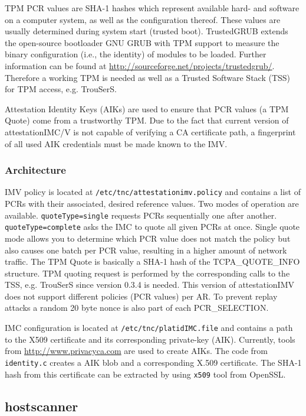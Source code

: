 \documentclass[a4paper,10pt]{scrartcl}
\newcommand{\code}[1]{{\tt{#1}}}
\begin{document}
TPM PCR values are SHA-1 hashes which represent available hard- and software on a computer system, as well as the configuration thereof. These values are usually determined during system start (trusted boot).
TrustedGRUB extends the open-source bootloader GNU GRUB with TPM support
to measure the binary configuration (i.e., the identity) of modules to be loaded.
Further information can be found at \url{http://sourceforge.net/projects/trustedgrub/}.
Therefore a working TPM is needed as well as a Trusted Software Stack (TSS) for TPM access, e.g. TrouSerS.

Attestation Identity Keys (AIKs) are used to ensure that PCR values (a TPM Quote) come from a trustworthy TPM.
Due to the fact that current version of attestationIMC/V is not capable of verifying a CA certificate path, a fingerprint of all used AIK credentials must be made known to the IMV.

\subsubsection{Architecture}

IMV policy is located at \code{/etc/tnc/attestationimv.policy} and contains
a list of PCRs with their associated, desired reference values.
Two modes of operation are available. \code{quoteType=single} requests PCRs sequentially one after another.
\code{quoteType=complete} asks the IMC to quote all given PCRs at once.
Single quote mode allows you to determine which PCR value does not match the policy but also causes 
one batch per PCR value, resulting in a higher amount of network traffic.
The TPM Quote is basically a SHA-1 hash of the TCPA\_QUOTE\_INFO structure.
TPM quoting request is performed by the corresponding calls to the TSS,
e.g. TrouSerS since version 0.3.4 is needed.
This version of attestationIMV does not support different policies (PCR values) per AR.
To prevent replay attacks a random 20 byte nonce is also part of each PCR\_SELECTION.

IMC configuration is located at \code{/etc/tnc/platidIMC.file} and contains a path to the 
X509 certificate and its corresponding private-key (AIK).
Currently, tools from \url{http://www.privacyca.com} are used
to create AIKs. The code from \code{identity.c} creates a AIK
blob and a corresponding X.509 certificate.
The SHA-1 hash from this certificate can be extracted by using
 \code{x509} tool from OpenSSL.

\subsection{hostscanner}
\end{document}
